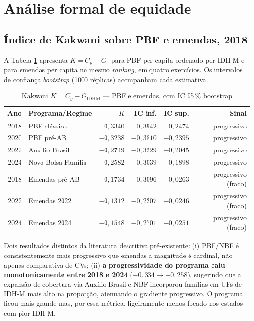 \documentclass[12pt,a4paper,oneside]{article}
\begin{document}
\section{Análise formal de equidade}\label{sec:equidade}


\subsection{Índice de Kakwani sobre PBF e emendas, 2018}

A Tabela \ref{tab:kakwani} apresenta $K = C_y - G_z$ para PBF
per capita ordenado por IDH-M e para emendas per capita no mesmo
\textit{ranking}, em quatro exercícios. Os intervalos de confiança
\textit{bootstrap} (1000 réplicas) acompanham cada estimativa.

\begin{table}[H]
\centering
\caption{Kakwani $K = C_y - G_{\mathrm{IDHM}}$ — PBF e emendas, com IC 95\,\% bootstrap}
\begin{tabular}{rlrrrr}
\toprule
\textbf{Ano} & \textbf{Programa/Regime} & $K$ & IC inf. & IC sup. & Sinal \\
\midrule
2018 & PBF clássico        & $-0{,}3340$ & $-0{,}3942$ & $-0{,}2474$ & progressivo \\
2020 & PBF pré-AB          & $-0{,}3238$ & $-0{,}3810$ & $-0{,}2395$ & progressivo \\
2022 & Auxílio Brasil      & $-0{,}2749$ & $-0{,}3229$ & $-0{,}2045$ & progressivo \\
2024 & Novo Bolsa Família  & $-0{,}2582$ & $-0{,}3039$ & $-0{,}1898$ & progressivo \\
\midrule
2018 & Emendas pré-AB      & $-0{,}1734$ & $-0{,}3096$ & $-0{,}0263$ & progressivo (fraco) \\
2022 & Emendas 2022        & $-0{,}1312$ & $-0{,}2207$ & $-0{,}0246$ & progressivo (fraco) \\
2024 & Emendas 2024        & $-0{,}1548$ & $-0{,}2701$ & $-0{,}0251$ & progressivo (fraco) \\
\bottomrule
\end{tabular}
\par{}
\label{tab:kakwani}
\end{table}

Dois resultados distintos da literatura descritiva pré-existente:
(i) PBF/NBF é consistentemente mais progressivo que emendas
\textemdash{} a magnitude é cardinal, não apenas comparativa de CVs;
(ii) \textbf{a progressividade do programa caiu monotonicamente
entre 2018 e 2024} ($-0,334 \to -0,258$), sugerindo que a expansão
de cobertura via Auxílio Brasil e NBF incorporou famílias em UFs
de IDH-M mais alto na proporção, atenuando o gradiente
progressivo. O programa ficou mais grande mas, por essa métrica,
ligeiramente menos focado nos estados com pior IDH-M.
\end{document}
